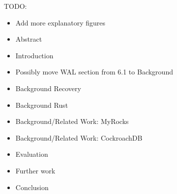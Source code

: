 \color{purple}
TODO:
\begin{itemize}
  \item Add more explanatory figures

  \item Abstract
  \item Introduction

  \item Possibly move WAL section from 6.1 to Background

  \item Background Recovery
  \item Background Rust

  \item Background/Related Work: MyRocks
  \item Background/Related Work: CockroachDB

  \item Evaluation
  \item Further work
  \item Conclusion
\end{itemize}

